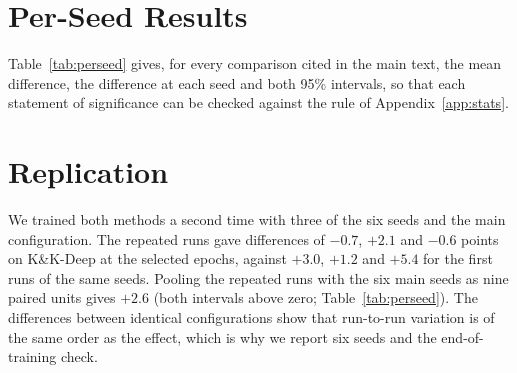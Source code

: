 \documentclass[10pt]{article}
\newcommand{\tf}{Tree Forcing}
\begin{document}
\section{Per-Seed Results}
\label{app:perseed}
Table~\ref{tab:perseed} gives, for every comparison cited in the main text, the mean difference, the difference at each
seed and both 95\% intervals, so that each statement of significance can be checked against the rule of
Appendix~\ref{app:stats}.

\begin{table}[!ht]
\centering
\scriptsize
\setlength{\tabcolsep}{3pt}
\caption{The main comparisons of the paper: mean difference (points), per-seed differences (one value per seed, in a fixed seed order; the replication row adds the three repeated runs),
95\% seed-level $t$ interval, 95\% two-level bootstrap interval, and test problems per seed. TF: \tf{}; AO:
answer-only; ``end'': end of training, no epoch selection.}
\label{tab:perseed}
\end{table}

\section{Replication}
\label{app:replication}
We trained both methods a second time with three of the six seeds and the main configuration. The repeated runs gave
differences of $-0.7$, $+2.1$
and $-0.6$ points on K\&K-Deep at the selected epochs, against $+3.0$, $+1.2$ and $+5.4$ for the first runs of the
same seeds. Pooling the repeated runs with the six main seeds as nine paired units gives $+2.6$ (both intervals above zero;
Table~\ref{tab:perseed}). The differences between identical configurations show that run-to-run variation is of the same
order as the effect, which is why we report six seeds and the end-of-training check.
\end{document}

